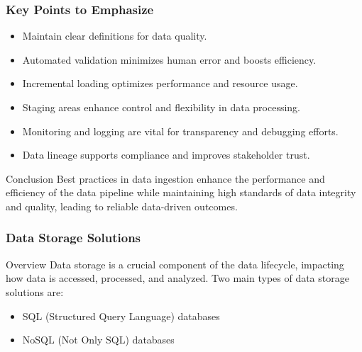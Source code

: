 \documentclass[aspectratio=169]{beamer}
\begin{document}
\begin{frame}[fragile]
    \frametitle{Key Points to Emphasize}
    \begin{itemize}
        \item Maintain clear definitions for data quality.
        \item Automated validation minimizes human error and boosts efficiency.
        \item Incremental loading optimizes performance and resource usage.
        \item Staging areas enhance control and flexibility in data processing.
        \item Monitoring and logging are vital for transparency and debugging efforts.
        \item Data lineage supports compliance and improves stakeholder trust.
    \end{itemize}

    \begin{block}{Conclusion}
        Best practices in data ingestion enhance the performance and efficiency of the data pipeline while maintaining high standards of data integrity and quality, leading to reliable data-driven outcomes.
    \end{block}
\end{frame}

\begin{frame}[fragile]
    \frametitle{Data Storage Solutions}
    \begin{block}{Overview}
        Data storage is a crucial component of the data lifecycle, impacting how data is accessed, processed, and analyzed. 
        Two main types of data storage solutions are:
        \begin{itemize}
            \item SQL (Structured Query Language) databases
            \item NoSQL (Not Only SQL) databases
        \end{itemize}
    \end{block}
\end{frame}
\end{document}
